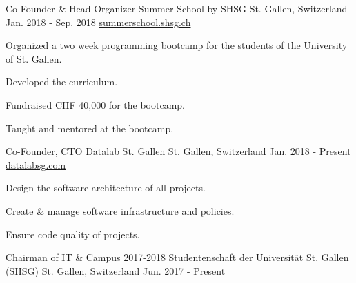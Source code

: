 \begin{cventries}
{    }
  \cventry
    {Co-Founder \& Head Organizer} %
    {Summer School by SHSG} %
    {St. Gallen, Switzerland} %
    {Jan. 2018 - Sep. 2018} %
    {\href{https://summerschool.shsg.ch}{summerschool.shsg.ch}} %
    {
      \begin{cvitems} %
      \item {Organized a two week programming bootcamp for the students of the University of St. Gallen.}
      \item {Developed the curriculum.}
      \item {Fundraised CHF 40,000 for the bootcamp.}
      \item {Taught and mentored at the bootcamp.}
      \end{cvitems}
    }
  \cventry
    {Co-Founder, CTO} %
    {Datalab St. Gallen} %
    {St. Gallen, Switzerland} %
    {Jan. 2018 - Present} %
    {\href{https://datalabsg.com}{datalabsg.com}} %
    {
      \begin{cvitems} %
      \item {Design the software architecture of all projects.}
      \item {Create \& manage software infrastructure and policies.}
      \item {Ensure code quality of projects.}
      \end{cvitems}
    }
  \cventry
    {Chairman of IT \& Campus 2017-2018} %
    {Studentenschaft der Universität St. Gallen (SHSG)} %
    {St. Gallen, Switzerland} %
    {Jun. 2017 - Present} %
    {} %
    {
      \begin{cvitems} %

\end{cvitems}}
\end{cventries}
